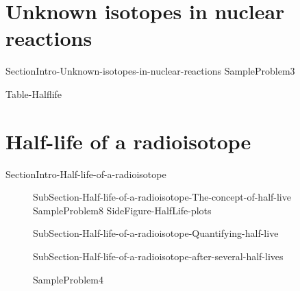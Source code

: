 \documentclass[main.tex]{subfiles}
\newcommand\chapterlabel{Ch-nuclear}\setcounter{figurenewcounter}{0}\setcounter{tablenewcounter}{0}\setcounter{formulanewcounter}{0}\chapterpicture{../{\chapterlabel}/figure1}\chapterpicturelabel{PxFuel}
\begin{document}
\section{Unknown isotopes in nuclear reactions}
{SectionIntro-Unknown-isotopes-in-nuclear-reactions}
  {SampleProblem3}
\begin{fullwidth}{Table-Halflife}\end{fullwidth}


 

\section{Half-life of a radioisotope}{SectionIntro-Half-life-of-a-radioisotope}
\sloppy \begin{description}
\item[]{SubSection-Half-life-of-a-radioisotope-The-concept-of-half-live}
  {SampleProblem8}
  {SideFigure-HalfLife-plots}
  \item[]{SubSection-Half-life-of-a-radioisotope-Quantifying-half-live}
\item[] {SubSection-Half-life-of-a-radioisotope-after-several-half-lives}

\renewcommand{\tikzmark}[3][]{\tikz[overlay,remember picture,baseline] \node [anchor=base,#1](#2) {#3};}



{SampleProblem4}
\end{description}
\end{document}

